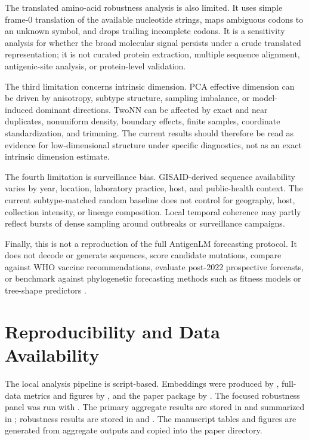 \documentclass[11pt]{article}
\begin{document}
The translated amino-acid robustness analysis is also limited. It uses simple frame-0 translation of the available nucleotide strings, maps ambiguous codons to an unknown symbol, and drops trailing incomplete codons. It is a sensitivity analysis for whether the broad molecular signal persists under a crude translated representation; it is not curated protein extraction, multiple sequence alignment, antigenic-site analysis, or protein-level validation.

The third limitation concerns intrinsic dimension. PCA effective dimension can be driven by anisotropy, subtype structure, sampling imbalance, or model-induced dominant directions. TwoNN can be affected by exact and near duplicates, nonuniform density, boundary effects, finite samples, coordinate standardization, and trimming. The current results should therefore be read as evidence for low-dimensional structure under specific diagnostics, not as an exact intrinsic dimension estimate.

The fourth limitation is surveillance bias. GISAID-derived sequence availability varies by year, location, laboratory practice, host, and public-health context. The current subtype-matched random baseline does not control for geography, host, collection intensity, or lineage composition. Local temporal coherence may partly reflect bursts of dense sampling around outbreaks or surveillance campaigns.

Finally, this is not a reproduction of the full AntigenLM forecasting protocol. It does not decode or generate sequences, score candidate mutations, compare against WHO vaccine recommendations, evaluate post-2022 prospective forecasts, or benchmark against phylogenetic forecasting methods such as fitness models or tree-shape predictors \cite{luksza2014fitness,neher2014predicting,hadfield2018nextstrain}.

\section{Reproducibility and Data Availability}

The local analysis pipeline is script-based. Embeddings were produced by , full-data metrics and figures by , and the paper package by . The focused robustness panel was run with . The primary aggregate results are stored in  and summarized in ; robustness results are stored in  and . The manuscript tables and figures are generated from aggregate outputs and copied into the paper directory.
\end{document}
